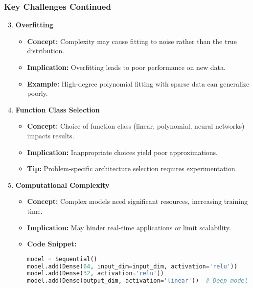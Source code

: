 \documentclass[aspectratio=169]{beamer}
\begin{document}
\begin{frame}[fragile]
  \frametitle{Key Challenges Continued}
  \begin{enumerate}
    \setcounter{enumi}{2} %
    \item \textbf{Overfitting}
      \begin{itemize}
        \item \textbf{Concept:} Complexity may cause fitting to noise rather than the true distribution.
        \item \textbf{Implication:} Overfitting leads to poor performance on new data.
        \item \textbf{Example:} High-degree polynomial fitting with sparse data can generalize poorly.
      \end{itemize}
    
    \item \textbf{Function Class Selection}
      \begin{itemize}
        \item \textbf{Concept:} Choice of function class (linear, polynomial, neural networks) impacts results.
        \item \textbf{Implication:} Inappropriate choices yield poor approximations.
        \item \textbf{Tip:} Problem-specific architecture selection requires experimentation.
      \end{itemize}

    \item \textbf{Computational Complexity}
      \begin{itemize}
        \item \textbf{Concept:} Complex models need significant resources, increasing training time.
        \item \textbf{Implication:} May hinder real-time applications or limit scalability.
        \item \textbf{Code Snippet:}
        \begin{lstlisting}[language=Python]
model = Sequential()
model.add(Dense(64, input_dim=input_dim, activation='relu'))
model.add(Dense(32, activation='relu'))
model.add(Dense(output_dim, activation='linear'))  # Deep model increasing complexity
        \end{lstlisting}
      \end{itemize}
  \end{enumerate}
\end{frame}
\end{document}
